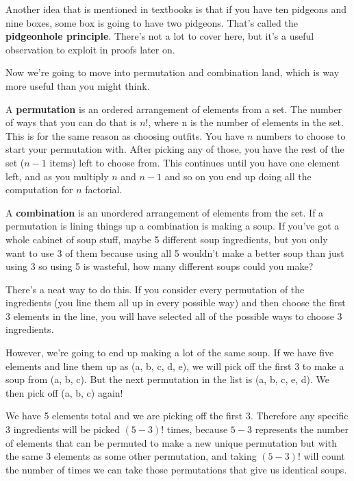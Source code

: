 \documentclass{article}
\begin{document}
    Another idea that is mentioned in textbooks is that if you have ten pidgeons and nine boxes, some box is going to have two pidgeons.
    That's called the \textbf{pidgeonhole principle}.
    There's not a lot to cover here, but it's a useful observation to exploit in proofs later on.

    Now we're going to move into permutation and combination land, which is way more useful than you might think.

    A \textbf{permutation} is an ordered arrangement of elements from a set.
    The number of ways that you can do that is $n!$, where n is the number of elements in the set.
    This is for the same reason as choosing outfits.
    You have $n$ numbers to choose to start your permutation with.
    After picking any of those, you have the rest of the set ($n-1$ items) left to choose from.
    This continues until you have one element left, and as you multiply $n$ and $n-1$ and so on you end up doing all the computation for $n$ factorial.

    A \textbf{combination} is an unordered arrangement of elements from the set.
    If a permutation is lining things up a combination is making a soup.
    If you've got a whole cabinet of soup stuff, maybe 5 different soup ingredients, but you only want to use 3 of them because using all 5 wouldn't make a better soup than just using 3 so using 5 is wasteful, how many different soups could you make?

    There's a neat way to do this.
    If you consider every permutation of the ingredients (you line them all up in every possible way)
    and then choose the first 3 elements in the line, you will have selected all of the possible ways to choose 3 ingredients.

    However, we're going to end up making a lot of the same soup.
    If we have five elements and line them up as (a, b, c, d, e), we will pick off the first 3 to make a soup from (a, b, c).
    But the next permutation in the list is (a, b, c, e, d). We then pick off (a, b, c) again!
    
    We have 5 elements total and we are picking off the first 3.
    Therefore any specific 3 ingredients will be picked $(5-3)!$ times, because $5-3$ represents the number of elements that can be permuted to make a new unique permutation but with the same 3 elements as some other permutation,
    and taking $(5-3)!$ will count the number of times we can take those permutations that give us identical soups.
\end{document}
